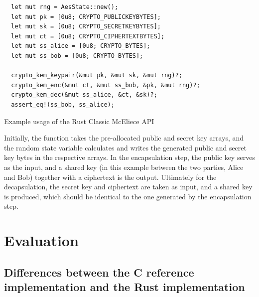 \documentclass[11pt,
  oneside,openany,    %
]{scrreprt}
\begin{document}
\begin{listing}[H]
\begin{verbatim}
  let mut rng = AesState::new();
  let mut pk = [0u8; CRYPTO_PUBLICKEYBYTES];
  let mut sk = [0u8; CRYPTO_SECRETKEYBYTES];
  let mut ct = [0u8; CRYPTO_CIPHERTEXTBYTES];
  let mut ss_alice = [0u8; CRYPTO_BYTES];
  let mut ss_bob = [0u8; CRYPTO_BYTES];

  crypto_kem_keypair(&mut pk, &mut sk, &mut rng)?;
  crypto_kem_enc(&mut ct, &mut ss_bob, &pk, &mut rng)?;
  crypto_kem_dec(&mut ss_alice, &ct, &sk)?;
  assert_eq!(ss_bob, ss_alice);
\end{verbatim}
  \caption{Example usage of the Rust Classic McEliece API}
  \label{list:ApiOverview}
\end{listing}

Initially, the  function takes the pre-allocated public and secret key arrays, and the random state variable calculates and writes the generated public and secret key bytes in the respective arrays. In the encapsulation step, the public key serves as the input, and a shared key (in this example between the two parties, Alice and Bob) together with a ciphertext is the output. Ultimately for the decapsulation, the secret key and ciphertext are taken as input, and a shared key  is produced, which should be identical to the one generated by the encapsulation step. 


\section{Evaluation}

\subsection{Differences between the C reference implementation and the Rust implementation}
\end{document}
